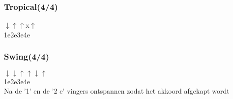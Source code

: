 \subsubsection*{Tropical(4/4)}
$\downarrow$\hspace{2em}\hphantom{$\uparrow$}\hspace{2em}\hphantom{x}\hspace{2em}$\uparrow$\hspace{2em}\hphantom{$\downarrow$}\hspace{2.2em}$\uparrow$\hspace{2em}x\hspace{2em}$\uparrow$\\
1\hspace{2em}e\hspace{2em}2\hspace{2em}e\hspace{2em}3\hspace{2em}e\hspace{2em}4\hspace{2em}e\\

\subsubsection*{Swing(4/4)}
$\downarrow$\hspace{2em}\hphantom{$\uparrow$}\hspace{2em}$\downarrow$\hspace{2em}$\uparrow$\hspace{2em}\hphantom{$\downarrow$}\hspace{2.1em}$\uparrow$\hspace{2.1em}$\downarrow$\hspace{2em}$\uparrow$\\
1\hspace{2em}e\hspace{2em}2\hspace{2em}e\hspace{2em}3\hspace{2em}e\hspace{2em}4\hspace{2em}e\\
Na de '1' en de '2 e' vingers ontspannen zodat het akkoord afgekapt wordt\\

